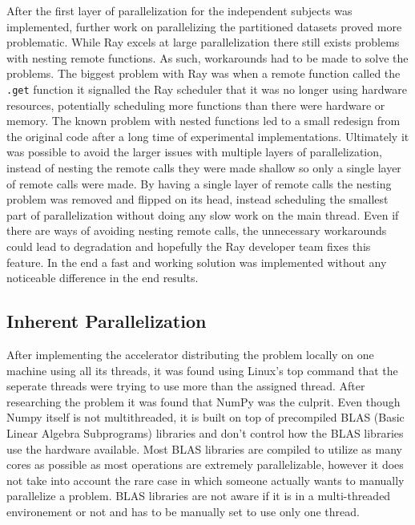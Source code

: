 \documentclass[12pt, a4paper]{article}
\begin{document}
After the first layer of parallelization for the independent subjects was implemented, further work on parallelizing the partitioned datasets proved more problematic.
While Ray excels at large parallelization there still exists problems with nesting remote functions. As such, workarounds had to be made to solve the problems.
The biggest problem with Ray was when a remote function called the \texttt{.get} function it signalled the Ray scheduler that it was no longer using hardware resources, potentially scheduling more functions than there were hardware or memory.
The known problem with nested functions led to a small redesign from the original code after a long time of experimental implementations. 
Ultimately it was possible to avoid the larger issues with multiple layers of parallelization, instead of nesting the remote calls they were made shallow so only a single layer of remote calls were made.
By having a single layer of remote calls the nesting problem was removed and flipped on its head, instead scheduling the smallest part of parallelization without doing any slow work on the main thread. 
Even if there are ways of avoiding nesting remote calls, the unnecessary workarounds could lead to degradation and hopefully the Ray developer team fixes this feature. 
In the end a fast and working solution was implemented without any noticeable difference in the end results.


\subsection{Inherent Parallelization}

After implementing the accelerator distributing the problem locally on one machine using all its threads, it was found using Linux's top command that the seperate threads were trying to use more than the assigned thread.
After researching the problem it was found that NumPy was the culprit.
Even though Numpy itself is not multithreaded, it is built on top of precompiled BLAS (Basic Linear Algebra Subprograms) libraries and don't control how the BLAS libraries use the hardware available.
Most BLAS libraries are compiled to utilize as many cores as possible as most operations are extremely parallelizable, however it does not take into account the rare case in which someone actually wants to manually parallelize a problem. 
BLAS libraries are not aware if it is in a multi-threaded environement or not and has to be manually set to use only one thread.
\end{document}
